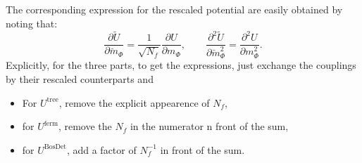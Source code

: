The corresponding expression for the rescaled potential are easily obtained by noting that:
\begin{equation}\label{eq:derivativesOfRescaledPotential}
 \frac{\partial \tilde U}{\partial \breve m_{\Phi}} = \frac{1}{\sqrt{N_f}}\frac{\partial U}{\partial m_{\Phi}},\qquad
 \frac{\partial^2 \tilde U}{\partial \breve m_{\Phi}^2} = \frac{\partial^2 U}{\partial m_{\Phi}^2}.
\end{equation}
Explicitly, for the three parts, to get the expressions, just exchange the couplings by their rescaled counterparts and
\begin{itemize}
 \item For $U^{\text{tree}}$, remove the explicit appearence of $N_f$,
 \item for $U^{\text{ferm}}$, remove the $N_f$ in the numerator n front of the sum,
 \item for $U^{\text{BosDet}}$, add a factor of $N_f^{-1}$ in front of the sum.
\end{itemize}



